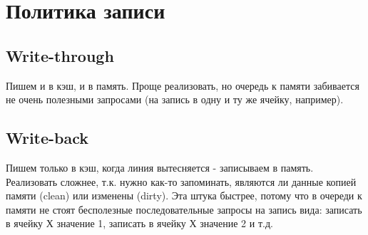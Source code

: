 \documentclass[12pt, a4paper]{article}
\begin{document}
\section{Политика записи}
\subsection{Write-through}
Пишем и в кэш, и в память. Проще реализовать, но очередь к памяти забивается не очень полезными запросами (на запись в одну и ту же ячейку, например).
\subsection{Write-back}
Пишем только в кэш, когда линия вытесняется - записываем в память. Реализовать сложнее, т.к. нужно как-то запоминать, являются ли данные копией памяти (clean) или изменены (dirty). Эта штука быстрее, потому что в очереди к памяти не стоят бесполезные последовательные запросы на запись вида: записать в ячейку Х значение 1, записать в ячейку Х значение 2 и т.д.
\end{document}
